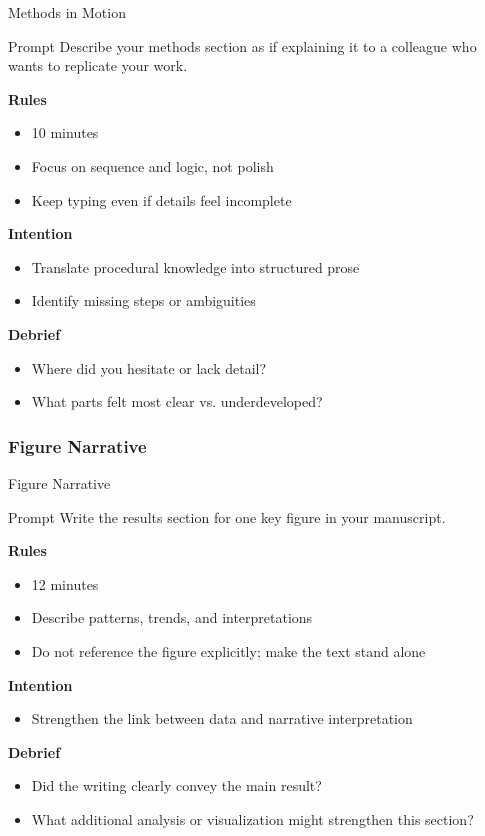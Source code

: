 \documentclass{beamer}
\begin{document}
\begin{frame}{Methods in Motion}
\begin{block}{Prompt}
Describe your methods section as if explaining it to a colleague who wants to replicate your work.
\end{block}

\vspace{0.8em}
\textbf{Rules}
\begin{itemize}
    \item 10 minutes
    \item Focus on sequence and logic, not polish
    \item Keep typing even if details feel incomplete
\end{itemize}

\textbf{Intention}
\begin{itemize}
    \item Translate procedural knowledge into structured prose
    \item Identify missing steps or ambiguities
\end{itemize}

\textbf{Debrief}
\begin{itemize}
    \item Where did you hesitate or lack detail?
    \item What parts felt most clear vs. underdeveloped?
\end{itemize}
\end{frame}

\subsubsection{Figure Narrative}

\begin{frame}{Figure Narrative}
\begin{block}{Prompt}
Write the results section for one key figure in your manuscript.
\end{block}

\vspace{0.8em}
\textbf{Rules}
\begin{itemize}
    \item 12 minutes
    \item Describe patterns, trends, and interpretations
    \item Do not reference the figure explicitly; make the text stand alone
\end{itemize}

\textbf{Intention}
\begin{itemize}
    \item Strengthen the link between data and narrative interpretation
\end{itemize}

\textbf{Debrief}
\begin{itemize}
    \item Did the writing clearly convey the main result?
    \item What additional analysis or visualization might strengthen this section?
\end{itemize}
\end{frame}
\end{document}
